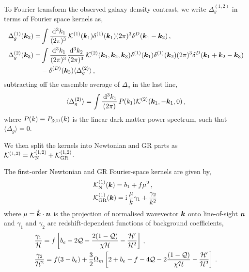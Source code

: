 To Fourier transform the observed galaxy density contrast, we write $\Delta_g^{(1,2)}$ in terms of Fourier space kernels as, 
\begin{align}
	\Delta_g^{(1)}(\bm {k}_2) =& \int \frac{\,\mathrm{d}^3 k_1}{(2\pi)^3}\, \mathcal{K}^{(1)}(\bm {k}_1) \delta^{(1)}(\bm {k}_1) (2\pi)^3 \delta^D(\bm {k}_1-\bm {k}_2)\,,\\
	\Delta_g^{(2)}(\bm {k}_3) =& \int \frac{\,\mathrm{d}^3 k_1}{(2\pi)^3} \frac{\,\mathrm{d}^3 k_2}{(2\pi)^3} \, \mathcal{K}^{(2)}(\bm {k}_1,\bm {k}_2,\bm {k}_3) \delta^{(1)}(\bm {k}_1) \delta^{(1)}(\bm {k}_2) (2\pi)^3 \delta^D(\bm {k}_1+\bm {k}_2-\bm {k}_3)\nonumber \\
	& - \delta^{(D)}(\bm {k}_3) \langle \Delta_g^{(2)} \rangle\,,
\end{align}
subtracting off the ensemble average of $\Delta_g$ in the last line, 
\begin{equation}
	\langle \Delta_g^{(2)} \rangle = \int \frac{\,\mathrm{d}^3 k_1}{(2\pi)}\, P(k_1) \mathcal{K}^{(2)}(\bm {k}_1, -\bm {k}_1,0)\,,
\end{equation}
where $P(k) \equiv P_{\delta^{(1)}}(k)$ is the linear dark matter power spectrum, such that $\langle \Delta_g \rangle = 0$. 

We then split the kernels into Newtonian and GR parts as $\mathcal{K}^{(1,2)} = \mathcal{K}_{\mathrm{N}}^{(1,2)} + \mathcal{K}_{\mathrm{GR}}^{(1,2)}$. 

The first-order Newtonian and GR Fourier-space kernels are given by, 
\begin{align}
	&\mathcal{K}^{(1)}_{\mathrm{N}}(\bm {k}) = b_1 + f \mu^2\,,\\
	&\mathcal{K}^{(1)}_{\mathrm{GR}}(\bm {k}) = \mathrm{i\,} \frac{\mu}{k}\gamma_1 + \frac{\gamma_2}{k^2}\,
\end{align}
where $\mu = \hat{\bm {k}}\cdot\bm {n}$ is the projection of normalised wavevector $\bm {k}$ onto line-of-sight $\bm {n}$\, and $\gamma_1$ and $\gamma_2$ are redshift-dependent functions of background coefficients, 
\begin{align}
	&\frac{\gamma_1}{\mathcal{H}} = f \left[ b_e - 2 \mathcal{Q} - \frac{2 (1 - \mathcal{Q})}{\chi \mathcal{H}}  - \frac{\mathcal{H}'}{\mathcal{H}^2} \right]\,,\\
	&\frac{\gamma_2}{\mathcal{H}^2} = f (3 - b_e) + \frac{3}{2} \Omega_m \left[ 2 + b_e - f - 4 \mathcal{Q} - 2 \frac{(1 - \mathcal{Q})}{\chi \mathcal{H}} - \frac{\mathcal{H}'}{\mathcal{H}^2} \right]\,. 
\end{align}

